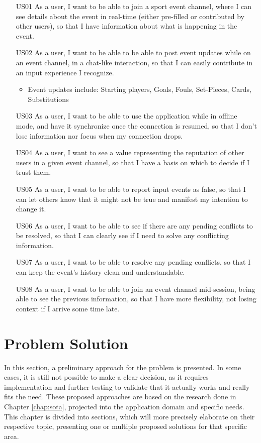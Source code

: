 \begin{itemize}[leftmargin  = 3.25\parindent, align=left]
    \item[US01] As a user, I want to be able to join a sport event channel, where I can see details about the event in real-time (either pre-filled or contributed by other users), so that I have information about what is happening in the event.
    \item[US02] As a user, I want to be able to be able to post event updates while on an event channel, in a chat-like interaction, so that I can easily contribute in an input experience I recognize.
    \begin{itemize}
        \item Event updates include: Starting players, Goals, Fouls, Set-Pieces, Cards, Substitutions
    \end{itemize} 
    \item[US03] As a user, I want to be able to use the application while in offline mode, and have it synchronize once the connection is resumed, so that I don't lose information nor focus when my connection drops.
    \item[US04] As a user, I want to see a value representing the reputation of other users in a given event channel, so that I have a basis on which to decide if I trust them. 
    \item[US05] As a user, I want to be able to report input events as false, so that I can let others know that it might not be true and manifest my intention to change it.
    \item[US06] As a user, I want to be able to see if there are any pending conflicts to be resolved, so that I can clearly see if I need to solve any conflicting information.
    \item[US07] As a user, I want to be able to resolve any pending conflicts, so that I can keep the event's history clean and understandable.
    \item[US08] As a user, I want to be able to join an event channel mid-session, being able to see the previous information, so that I have more flexibility, not losing context if I arrive some time late.
\end{itemize}

\section{Problem Solution}\label{sec:prob-sol}

In this section, a preliminary approach for the problem is presented. In some cases, it is still not possible to make a clear decision, as it requires implementation and further testing to validate that it actually works and really fits the need. These proposed approaches are based on the research done in Chapter \ref{chap:sota}, projected into the application domain and specific needs. This chapter is divided into sections, which will more precisely elaborate on their respective topic, presenting one or multiple proposed solutions for that specific area. 

